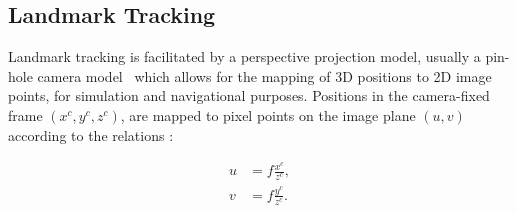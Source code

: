 







\subsection{Landmark Tracking}

Landmark tracking is facilitated by a perspective projection model, usually a
pin-hole camera model~\cite{Shuang2008} which allows for the mapping of 3D
positions to 2D image points, for simulation and navigational purposes.
Positions in the camera-fixed frame $(x^c, y^c, z^c)$, are mapped to pixel
points on the image plane $(u,v)$ according to the relations \cite{Shuang2008}:

\begin{equation}
    \begin{aligned}
        u & =f\frac{x^c}{z^c}, \\
        v & =f\frac{y^c}{z^c}.
    \end{aligned}
\end{equation}

